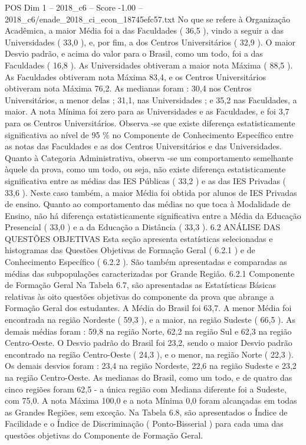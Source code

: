 \begin{textsample}{POS Dim 1 – 2018\_c6 – Score -1.00 – 2018\_c6/enade\_2018\_ci\_econ\_18745efc57.txt}
No que se refere à Organização Acadêmica, a maior Média foi a das Faculdades ( 36,5 ), vindo a seguir a das Universidades ( 33,0 ), e, por fim, a dos Centros Universitários ( 32,9 ).
O maior Desvio padrão, e acima do valor para o Brasil, como um todo, foi a das Faculdades ( 16,8 ).
As Universidades obtiveram a maior nota Máxima ( 88,5 ).
As Faculdades obtiveram nota Máxima 83,4, e os Centros Universitários obtiveram nota Máxima 76,2.
As medianas foram : 30,4 nos Centros Universitários, a menor delas ; 31,1, nas Universidades ; e 35,2 nas Faculdades, a maior.
A nota Mínima foi zero para as Universidades e as Faculdades, e foi 3,7 para os Centros Universitários.
Observa -se que existe diferença estatisticamente significativa ao nível de 95 \% no Componente de Conhecimento Específico entre as notas das Faculdades e as dos Centros Universitários e das Universidades.
Quanto à Categoria Administrativa, observa -se um comportamento semelhante àquele da prova, como um todo, ou seja, não existe diferença estatisticamente significativa entre as médias das IES Públicas ( 33,2 ) e as das IES Privadas ( 33,6 ).
Neste caso também, a maior Média foi obtida por alunos de IES Privadas de ensino.
Quanto ao comportamento das médias no que toca à Modalidade de Ensino, não há diferença estatisticamente significativa entre a Média da Educação Presencial ( 33,0 ) e a da Educação a Distância ( 33,3 ). 6.2 ANÁLISE DAS QUESTÕES OBJETIVAS Esta seção apresenta estatísticas selecionadas e histogramas das Questões Objetivas de Formação Geral ( 6.2.1 ) e de Conhecimento Específico ( 6.2.2 ).
São também apresentadas e comparadas as médias das subpopulações caracterizadas por Grande Região. 6.2.1 Componente de Formação Geral Na Tabela 6.7, são apresentadas as Estatísticas Básicas relativas às oito questões objetivas do componente da prova que abrange a Formação Geral dos estudantes.
A Média do Brasil foi 63,7.
A menor Média foi encontrada na região Nordeste ( 59,3 ), e a maior, na região Sudeste ( 66,5 ).
As demais médias foram : 59,8 na região Norte, 62,2 na região Sul e 62,3 na região Centro-Oeste.
O Desvio padrão do Brasil foi 23,2, sendo o maior Desvio padrão encontrado na região Centro-Oeste ( 24,3 ), e o menor, na região Norte ( 22,3 ).
Os demais desvios foram : 23,4 na região Nordeste, 22,6 na região Sudeste e 23,2 na região Centro-Oeste.
As medianas do Brasil, como um todo, e de quatro das cinco regiões foram 62,5 - a única região com Mediana diferente foi a Sudeste, com 75,0.
A nota Máxima 100,0 e a nota Mínima 0,0 foram alcançadas em todas as Grandes Regiões, sem exceção.
Na Tabela 6.8, são apresentados o Índice de Facilidade e o Índice de Discriminação ( Ponto-Bisserial ) para cada uma das questões objetivas do Componente de Formação Geral.

\end{textsample}

